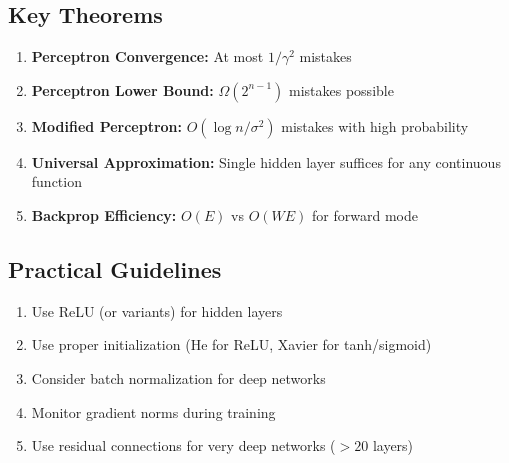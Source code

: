 \documentclass[main.tex]{subfiles}
\begin{document}
\subsection{Key Theorems}

\begin{enumerate}
    \item \textbf{Perceptron Convergence:} At most $1/\gamma^2$ mistakes
    \item \textbf{Perceptron Lower Bound:} $\Omega(2^{n-1})$ mistakes possible
    \item \textbf{Modified Perceptron:} $O(\log n / \sigma^2)$ mistakes with high probability
    \item \textbf{Universal Approximation:} Single hidden layer suffices for any continuous function
    \item \textbf{Backprop Efficiency:} $O(E)$ vs $O(WE)$ for forward mode
\end{enumerate}

\subsection{Practical Guidelines}

\begin{enumerate}
    \item Use ReLU (or variants) for hidden layers
    \item Use proper initialization (He for ReLU, Xavier for tanh/sigmoid)
    \item Consider batch normalization for deep networks
    \item Monitor gradient norms during training
    \item Use residual connections for very deep networks ($> 20$ layers)
\end{enumerate}
\end{document}
